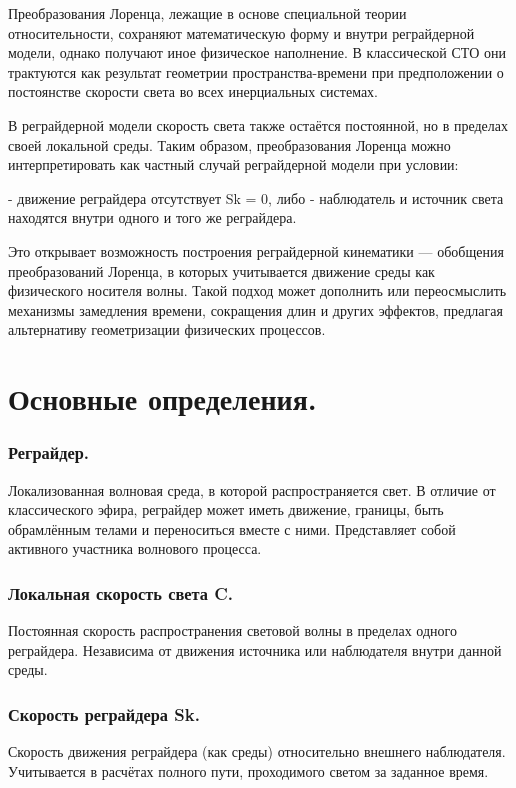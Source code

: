 \documentclass[12pt]{article}
\begin{document}
Преобразования Лоренца, лежащие в основе специальной теории относительности, сохраняют математическую форму и внутри реграйдерной модели, однако получают иное физическое наполнение. В классической СТО они трактуются как результат геометрии пространства-времени при предположении о постоянстве скорости света во всех инерциальных системах.

В реграйдерной модели скорость света также остаётся постоянной, но в пределах своей локальной среды. Таким образом, преобразования Лоренца можно интерпретировать как частный случай реграйдерной модели при условии:

- движение реграйдера отсутствует Sk = 0, либо
- наблюдатель и источник света находятся внутри одного и того же реграйдера.

Это открывает возможность построения реграйдерной кинематики — обобщения преобразований Лоренца, в которых учитывается движение среды как физического носителя волны. Такой подход может дополнить или переосмыслить механизмы замедления времени, сокращения длин и других эффектов, предлагая альтернативу геометризации физических процессов.

\section*{Основные определения.}

\subsubsection*{Реграйдер.}
Локализованная волновая среда, в которой распространяется свет. В отличие от классического эфира, реграйдер может иметь движение, границы, быть обрамлённым телами и переноситься вместе с ними. Представляет собой активного участника волнового процесса.

\subsubsection*{Локальная скорость света C.}
Постоянная скорость распространения световой волны в пределах одного реграйдера. Независима от движения источника или наблюдателя внутри данной среды.

\subsubsection*{Скорость реграйдера Sk.}
Скорость движения реграйдера (как среды) относительно внешнего наблюдателя. Учитывается в расчётах полного пути, проходимого светом за заданное время.
\end{document}
